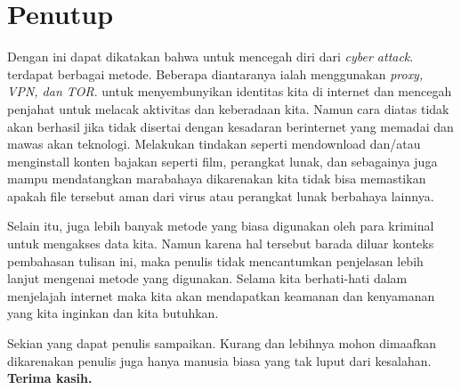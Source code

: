 \documentclass{article}
\begin{document}
        


        \section{Penutup}
        Dengan ini dapat dikatakan bahwa untuk mencegah diri dari \textit{cyber attack}.
        terdapat berbagai metode. Beberapa diantaranya ialah menggunakan \textit{proxy, VPN, dan TOR}.
        untuk menyembunyikan identitas kita di internet dan mencegah penjahat untuk
        melacak aktivitas dan keberadaan kita. Namun cara diatas tidak akan berhasil jika
        tidak disertai dengan kesadaran berinternet yang memadai dan mawas akan teknologi.
        Melakukan tindakan seperti mendownload dan/atau menginstall konten bajakan seperti
        film, perangkat lunak, dan sebagainya juga mampu mendatangkan marabahaya dikarenakan
        kita tidak bisa memastikan apakah file tersebut aman dari virus atau perangkat
        lunak berbahaya lainnya.

        Selain itu, juga lebih banyak metode yang biasa digunakan oleh para kriminal
        untuk mengakses data kita. Namun karena hal tersebut barada diluar konteks
        pembahasan tulisan ini, maka penulis tidak mencantumkan penjelasan lebih lanjut
        mengenai metode yang digunakan. Selama kita berhati-hati dalam menjelajah internet
        maka kita akan mendapatkan keamanan dan kenyamanan yang kita inginkan dan kita butuhkan.

        Sekian yang dapat penulis sampaikan. Kurang dan lebihnya mohon dimaafkan dikarenakan
        penulis juga hanya manusia biasa yang tak luput dari kesalahan.
        \textbf{Terima kasih.}

        \nocite{*}
        
        
        
        
\end{document}
